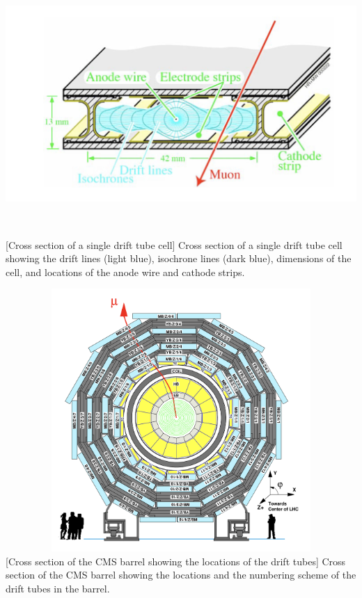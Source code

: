 \begin{multiFigure}
    \centering
    \includegraphics[width=15cm,height=10cm,keepaspectratio]{figures/cms/muonsys/drifttube_xs.jpeg}
        [Cross section of a single drift tube cell]
        {Cross section of a single drift tube cell showing the drift lines (light blue), isochrone lines (dark blue), dimensions of the cell, and locations of the anode wire and cathode strips.}
    \label{fig:dt_cell}
\end{multiFigure}
\begin{multiFigure}
    \centering
    \includegraphics[width=15cm,height=10cm,keepaspectratio]{figures/cms/muonsys/drifttube_locations.jpeg}
        [Cross section of the CMS barrel showing the locations of the drift tubes]
        {Cross section of the CMS barrel showing the locations and the numbering scheme of the drift tubes in the barrel.}
        \label{fig:dt_locations}
\end{multiFigure}

